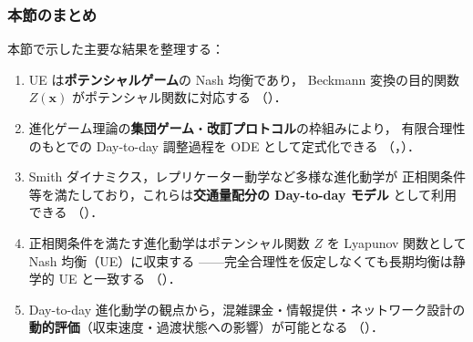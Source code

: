 \subsubsection*{本節のまとめ}

本節で示した主要な結果を整理する：
\begin{enumerate}
  \item UE は\textbf{ポテンシャルゲーム}の Nash 均衡であり，
        Beckmann 変換の目的関数 $Z(\boldsymbol{x})$ がポテンシャル関数に対応する
        （）．
  \item 進化ゲーム理論の\textbf{集団ゲーム}・\textbf{改訂プロトコル}の枠組みにより，
        有限合理性のもとでの Day-to-day 調整過程を ODE として定式化できる
        （，）．
  \item Smith ダイナミクス，レプリケーター動学など多様な進化動学が
        正相関条件等を満たしており，これらは\textbf{交通量配分の Day-to-day モデル}
        として利用できる
        （）．
  \item 正相関条件を満たす進化動学はポテンシャル関数 $Z$ を Lyapunov 関数として
        Nash 均衡（UE）に収束する
        ——完全合理性を仮定しなくても長期均衡は静学的 UE と一致する
        （）．
  \item Day-to-day 進化動学の観点から，混雑課金・情報提供・ネットワーク設計の
        \textbf{動的評価}（収束速度・過渡状態への影響）が可能となる
        （）．
\end{enumerate}
